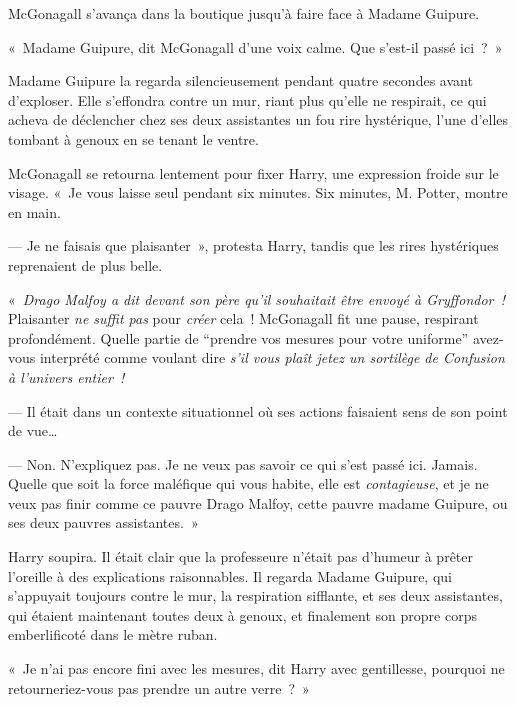 McGonagall s'avança dans la boutique jusqu'à faire face à Madame Guipure.

«~Madame Guipure, dit McGonagall d'une voix calme. Que s'est-il passé ici~?~»

Madame Guipure la regarda silencieusement pendant quatre secondes avant d'exploser. Elle s'effondra contre un mur, riant plus qu'elle ne respirait, ce qui acheva de déclencher chez ses deux assistantes un fou rire hystérique, l'une d'elles tombant à genoux en se tenant le ventre.

McGonagall se retourna lentement pour fixer Harry, une expression froide sur le visage. «~Je vous laisse seul pendant six minutes. Six minutes, M. Potter, montre en main.

--- Je ne faisais que plaisanter~», protesta Harry, tandis que les rires hystériques reprenaient de plus belle.

«~\emph{Drago Malfoy a dit devant son père qu'il souhaitait être envoyé à Gryffondor~!} Plaisanter \emph{ne suffit pas} pour \emph{créer} cela~! McGonagall fit une pause, respirant profondément. Quelle partie de ``prendre vos mesures pour votre uniforme'' avez-vous interprété comme voulant dire \emph{s'il vous plaît jetez un sortilège de Confusion à l'univers entier~!}

--- Il était dans un contexte situationnel où ses actions faisaient sens de son point de vue…

--- Non. N'expliquez pas. Je ne veux pas savoir ce qui s'est passé ici. Jamais. Quelle que soit la force maléfique qui vous habite, elle est \emph{contagieuse}, et je ne veux pas finir comme ce pauvre Drago Malfoy, cette pauvre madame Guipure, ou ses deux pauvres assistantes.~»

Harry soupira. Il était clair que la professeure n'était pas d'humeur à prêter l'oreille à des explications raisonnables. Il regarda Madame Guipure, qui s'appuyait toujours contre le mur, la respiration sifflante, et ses deux assistantes, qui étaient maintenant toutes deux à genoux, et finalement son propre corps emberlificoté dans le mètre ruban.

«~Je n'ai pas encore fini avec les mesures, dit Harry avec gentillesse, pourquoi ne retourneriez-vous pas prendre un autre verre~?~»

